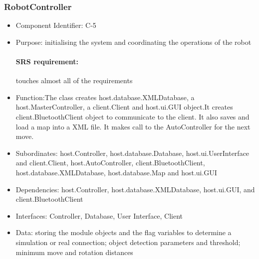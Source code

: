 \documentclass[11pt, a4paper]{report}
\begin{document}
\subsubsection{RobotController}
\begin{itemize}
\item Component Identifier: C-5
\item Purpose: initialising the system and coordinating the operations of the robot
\paragraph{SRS requirement:} touches almost all of the requirements
\item Function:The class creates host.database.XMLDatabase, a host.MasterController,
a client.Client and host.ui.GUI object.It creates client.BluetoothClient object to communicate 
to the client. It also saves and load a map
 into a XML file. It makes call to the AutoController for the next move.
\item Subordinates: host.Controller, host.database.Database, host.ui.UserInterface and
 client.Client, host.AutoController, client.BluetoothClient,
host.database.XMLDatabase, host.database.Map and host.ui.GUI
\item Dependencies: host.Controller, host.database.XMLDatabase, host.ui.GUI, and client.BluetoothClient
\item Interfaces: Controller, Database, User Interface, Client
\item Data: storing the module objects and the flag variables to determine a simulation
or real connection; object detection parameters and threshold; minimum move and rotation distances
\end{itemize}
\end{document}
